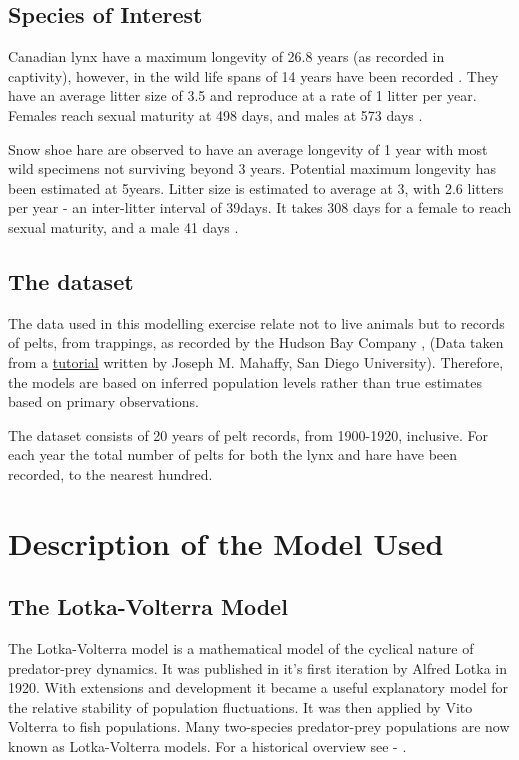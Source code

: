 \documentclass{article}
\begin{document}
\subsection{Species of Interest}
Canadian lynx have a maximum longevity of 26.8 years (as recorded in captivity), however, in the wild life spans of 14 years have been recorded \parencite{nowak_walkers_1999}. They have an average litter size of 3.5 and reproduce at a rate of 1 litter per year. Females reach sexual maturity at  498 days, and males at 573 days \parencite{tacutu_human_2018}. 

Snow shoe hare are observed to have an average longevity of 1 year with most wild specimens not surviving beyond 3 years. Potential maximum longevity has been estimated at 5years. Litter size is estimated to average at 3, with 2.6 litters per year - an inter-litter interval of 39days\parencite{nowak_walkers_1999}. It takes 308 days for a female to reach sexual maturity, and a male 41 days \parencite{tacutu_human_2018}. 

\subsection{The dataset}
The data used in this modelling exercise relate not to live animals but to records of pelts, from trappings, as recorded by the Hudson Bay Company \parencite{maclulich_place_1957}, (Data taken from a \href{https://jmahaffy.sdsu.edu/courses/f09/math636/lectures/lotka/qualde2.html}{tutorial} written by Joseph M. Mahaffy, San Diego University). Therefore, the models are based on inferred population levels rather than true estimates based on primary observations. 

The dataset consists of 20 years of pelt records, from 1900-1920, inclusive. For each year the total number of pelts for both the lynx and hare have been recorded, to the nearest hundred. 

\clearpage
\section{Description of the Model Used}
\subsection{The Lotka-Volterra Model}
The Lotka-Volterra model is a mathematical model of the cyclical nature of predator-prey dynamics. It was published in it's first iteration by Alfred Lotka in 1920. With extensions and development it became a useful explanatory model for the relative stability of population fluctuations. It was then applied by Vito Volterra to fish populations. Many two-species predator-prey populations are now known as Lotka-Volterra models. For a historical overview see - \parencite{berryman_orgins_1992}.
\end{document}
